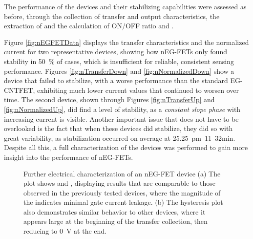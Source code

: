 The performance of the devices and their stabilizing capabilities were assessed as before, through the collection of transfer and output characteristics, the extraction of \ion{} and the calculation of ON/OFF ratio and \vth{}. 

Figure \ref{fig:nEGFETData} displays the transfer characteristics and the normalized current for two representative devices, showing how nEG-FETs only found stability in \SI{50}{\%} of cases, which is insufficient for reliable, consistent sensing performance. Figures \ref{fig:nTransferDown} and \ref{fig:nNormalizedDown} show a device that failed to stabilize, with a worse performance than the standard EG-CNTFET, exhibiting much lower current values that continued to worsen over time. The second device, shown through Figures \ref{fig:nTransferUp} and \ref{fig:nNormalizedUp}, did find a level of stability, as a \emph{constant slope phase} with increasing current is visible. Another important issue that does not have to be overlooked is the fact that when these devices did stabilize, they did so with great variability, as stabilization occurred on average at \SI{25.25}{\pm 11.32}{min}. Despite all this, a full characterization of the devices was performed to gain more insight into the performance of nEG-FETs.

\begin{figure}
    \centering
    \hfill
    \caption{Further electrical characterization of an nEG-FET device 
    (a) The plot shows \ids and \igs, displaying results that are comparable to those observed in the previously tested devices, where the magnitude of the \igs{} indicates minimal gate current leakage.
    (b) The hysteresis plot also demonstrates similar behavior to other devices, where it appears large at the beginning of the transfer collection, then reducing to \SI{0}{\V} at the end.}
    \label{fig:nParameters}
\end{figure}

